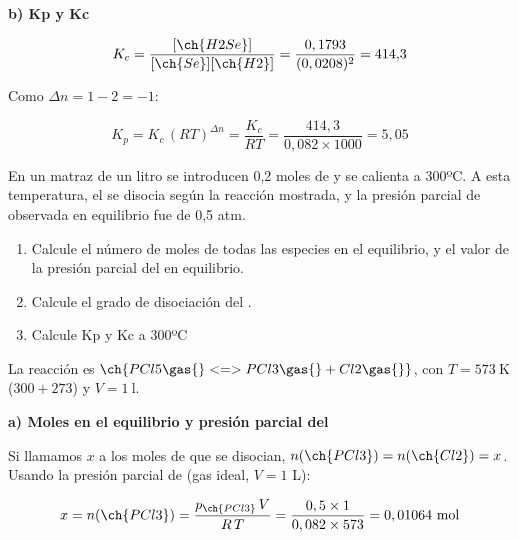 \begin{exerciseEVAU}
\begin{solu}
    \textbf{b) Kp y Kc}

    \begin{equation*}
        K_c = \dfrac{[\ch{H2Se}]}{[\ch{Se}][\ch{H2}]} = \dfrac{0,1793}{(0,0208)^2} = 414{,}3
    \end{equation*}

    Como \(\Delta n = 1 - 2 = -1\):

    \begin{equation*}
        K_p = K_c\, (R T)^{\Delta n} = \dfrac{K_c}{R T} = \dfrac{414,3}{0,082 \times 1000} = 5,05
    \end{equation*}

\end{solu}
\end{exerciseEVAU}

\begin{exerciseEVAU}
    En un matraz de un litro se introducen 0,2 moles de  y se calienta a 300ºC. A esta temperatura, el  se disocia según la reacción mostrada, y la presión parcial de  observada en equilibrio fue de 0,5 atm.
    \begin{centeredequation}
    \end{centeredequation}
    \begin{enumerate}[label=\letraminuscula]
    \item Calcule el número de moles de todas las especies en el equilibrio, y el valor de la presión
    parcial del  en equilibrio.
    \item Calcule el grado de disociación del .
    \item Calcule Kp y Kc a 300ºC
    \end{enumerate}
    \begin{solu}

        La reacción es \(\ch{PCl5 \gas{} <=> PCl3 \gas{} + Cl2 \gas{}}\), con \(T = \SI{573}{\kelvin}\) (\(300+273\)) y \(V = \SI{1}{\litre}\).

        \textbf{a) Moles en el equilibrio y presión parcial del }

        Si llamamos \(x\) a los moles de  que se disocian, \(n(\ch{PCl3}) = n(\ch{Cl2}) = x\). Usando la presión parcial de  (gas ideal, \(V=1\) L):

        \begin{equation*}
            x = n(\ch{PCl3}) = \dfrac{p_{\ch{PCl3}}\, V}{R\, T} = \dfrac{0,5 \times 1}{0,082 \times 573} = 0,01064 \ \text{mol}
        \end{equation*}


\end{solu}
\end{exerciseEVAU}
